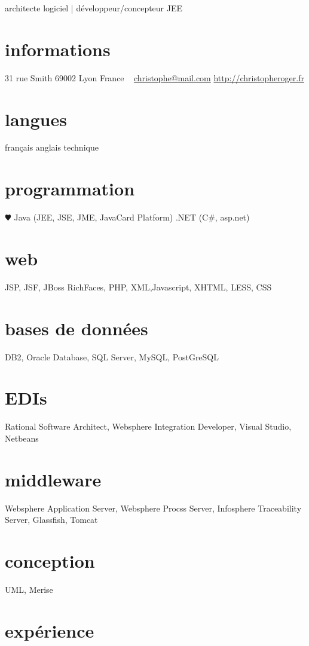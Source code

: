 \documentclass[]{roger-cv}
\begin{document}
       {architecte logiciel | développeur/concepteur JEE}


\begin{aside}
  \section{informations}
    31 rue Smith
    69002 Lyon
    France
    ~
    \href{mailto:christophe@mail.com}{christophe@mail.com}
    \href{http://christopheroger.fr}{http://christopheroger.fr}
  \section{langues}
    français
    anglais technique
  \section{programmation}
    {\color{red} $\varheartsuit$} Java (JEE, JSE, JME, JavaCard Platform)
    .NET (C\#, asp.net)
  \section{web}
    {JSP, JSF, JBoss RichFaces, PHP, XML,Javascript, XHTML, LESS, CSS}
  \section{bases de données}
    {DB2, Oracle Database, SQL Server, MySQL, PostGreSQL}
  \section{EDIs}
    {Rational Software Architect, Websphere Integration Developer, Visual Studio, Netbeans}
  \section{middleware}
    {Websphere Application Server, Websphere Procss Server, Infosphere Traceability Server, Glassfish, Tomcat}
  \section{conception}
    {UML, Merise}
\end{aside}

\section{expérience}
\end{document}
